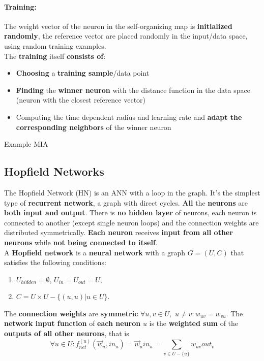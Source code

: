\paragraph{Training:} The weight vector of the neuron in the self-organizing map is \textbf{initialized randomly}, the reference vector are placed randomly in the input/data space, using random training examples.\\

The \textbf{training} itself \textbf{consists of}: 
\begin{itemize}
	\item \textbf{Choosing} a \textbf{training sample}/data point
	\item \textbf{Finding} the \textbf{winner neuron} with the distance function in the data space (neuron with the closest reference vector)
	\item Computing the time dependent radius and learning rate and \textbf{adapt the corresponding neighbors} of the winner neuron
\end{itemize}

\vfill

Example MIA


\newpage

\subsection{Hopfield Networks}
The Hopfield Network (HN) is an ANN with a loop in the graph. It's the simplest type of \textbf{recurrent network}, a graph with direct cycles. \textbf{All} the \textbf{neurons} are \textbf{both input and output}. There is \textbf{no hidden layer} of neurons, each neuron is connected to another (except single neuron loops) and the connection weights are distributed symmetrically. \textbf{Each neuron} receives \textbf{input from all other neurons} while \textbf{not being connected to itself}.\\

A \textbf{Hopfield network} is a \textbf{neural network} with a graph $G = (U, C)$ that satisfies the following conditions:
\begin{enumerate}
	\item $U_{hidden} = \emptyset$, $U_{in} = U_{out} = U$,
	\item $C = U \times U - \{(u, u) | u \in U \}$.
\end{enumerate}

The \textbf{connection weights} are \textbf{symmetric} $\forall u, v \in U,$ $u \neq v: w_{uv} = w_{vu}$. The \textbf{network input function} of \textbf{each neuron} $u$ is the \textbf{weighted sum} of the \textbf{outputs of all other neurons}, that is
$$ \forall u \in U: f_{net}^{(u)} (\vec{w}_u, in_{u}) = \vec{w}_u in_u = \sum_{v \in U - \{u\}} w_{uv} out_v $$

